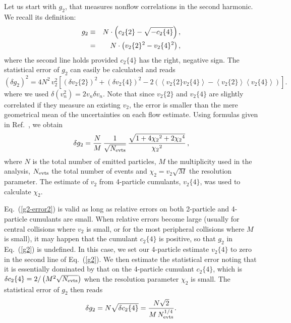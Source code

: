 \documentclass[aps,prc,superscriptaddress,showpacs,floatfix,nofootinbib]{revtex4}
\newcommand{\mean}[1]{\left\langle #1 \right\rangle}
\begin{document}
Let us start with $g_2$, that measures nonflow correlations in the
second harmonic.  We recall its definition:
\begin{eqnarray}
\label{g2}
g_2 & \equiv & N \cdot \left( c_2\{2\} - \sqrt{-c_2\{4\}} \right), \cr
 & = & N \cdot \left( v_2\{2\}^2 - v_2\{4\}^2 \right),
\end{eqnarray}
where the second line holds provided $c_2\{4\}$ has the right,
negative sign.  The statistical error of $g_2$ can easily be
calculated and reads
\begin{equation}
\label{g2-error}
\left( \delta g_2 \right)^2 =  
4 N^2 \,v_2^2 \left[ (\delta v_2\{2\})^2 + (\delta v_2\{4\})^2 - 
 2\left( \mean{v_2\{2\} v_2\{4\}} - \mean{v_2\{2\}}\mean{v_2\{4\}} \right) 
\right]. 
\end{equation}
where we used $\delta(v_n^2) = 2 v_n \delta v_n$.
Note that since $v_2\{2\}$ and $v_2\{4\}$ are slightly correlated if
they measure an existing $v_2$, the error is smaller than the
mere geometrical mean of the uncertainties on each flow estimate. 
Using formulas given in Ref.~\cite{Borghini:2001vi}, we obtain
\begin{equation}
\label{g2-error2}
\delta g_2 = \frac{N}{M} \, \frac{1}{\sqrt{N_{\rm evts}}} \,
\frac{\sqrt{1 + 4{\chi_2}^2 + 2{\chi_2}^4}}{{\chi_2}^2}\, ,
\end{equation}
where $N$ is the total number of emitted particles, $M$ the
multiplicity used in the analysis, $N_{\rm evts}$ the total number of
events and ${\chi_2}=v_2\sqrt{M}$ the resolution parameter.  The
estimate of $v_2$ from 4-particle cumulants, $v_2\{4\}$, was used to
calculate $\chi_2$.

Eq.~(\ref{g2-error2}) is valid as long as relative errors on both
2-particle and 4-particle cumulants are small.  When relative errors
become large (usually for central collisions where $v_2$ is small, or
for the most peripheral collisions where $M$ is small), it may happen
that the cumulant $c_2\{4\}$ is positive, so that $g_2$ in
Eq.~(\ref{g2}) is undefined.  In this case, we set our 4-particle
estimate $v_2\{4\}$ to zero in the second line of Eq.~(\ref{g2}). We
then estimate the statistical error noting that it is essentially
dominated by that on the 4-particle cumulant $c_2\{4\}$, which is
$\delta c_2\{4\}=2/\left(M^2 \sqrt{N_{\rm
evts}}\right)$\cite{Borghini:2001vi} when the resolution parameter
$\chi_2$ is small. The statistical error of $g_2$ then reads
\begin{equation}
\label{g2-error3}
\delta g_2 = N \sqrt{\delta c_2\{4\}}=
 \frac{N\sqrt{2}}{M\,N_{\rm evts}^{1/4}}.
\end{equation}
\end{document}
